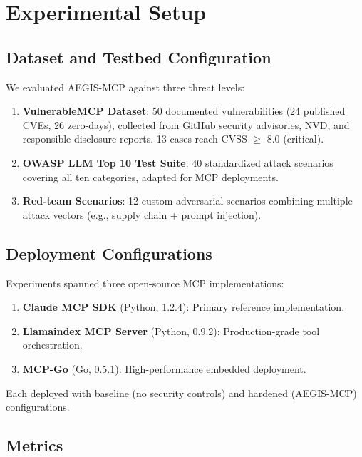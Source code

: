 \documentclass[12pt,twocolumn,journal]{IEEEtran}
\begin{document}
\section{Experimental Setup}
\label{sec:experiments}

\subsection{Dataset and Testbed Configuration}

We evaluated AEGIS-MCP against three threat levels:

\begin{enumerate}
\item \textbf{VulnerableMCP Dataset}: 50 documented vulnerabilities (24 published CVEs, 26 zero-days), collected from GitHub security advisories, NVD, and responsible disclosure reports. 13 cases reach CVSS $\geq$ 8.0 (critical).

\item \textbf{OWASP LLM Top 10 Test Suite}: 40 standardized attack scenarios covering all ten categories, adapted for MCP deployments.

\item \textbf{Red-team Scenarios}: 12 custom adversarial scenarios combining multiple attack vectors (e.g., supply chain + prompt injection).
\end{enumerate}

\subsection{Deployment Configurations}

Experiments spanned three open-source MCP implementations:

\begin{enumerate}
\item \textbf{Claude MCP SDK} (Python, 1.2.4): Primary reference implementation.
\item \textbf{Llamaindex MCP Server} (Python, 0.9.2): Production-grade tool orchestration.
\item \textbf{MCP-Go} (Go, 0.5.1): High-performance embedded deployment.
\end{enumerate}

Each deployed with baseline (no security controls) and hardened (AEGIS-MCP) configurations.

\subsection{Metrics}
\end{document}
